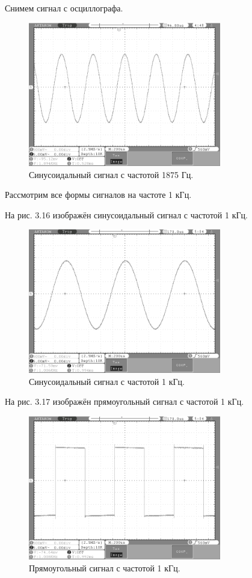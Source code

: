 	Снимем сигнал с осциллографа.
	\begin{figure}[H]
    \centering
    \includegraphics[width=0.75\textwidth]{../image/1875.bmp}
    \caption{Синусоидальный сигнал с частотой 1875 Гц.}
	\end{figure}	
	
	Рассмотрим все формы сигналов на частоте 1 кГц.
	
	На рис. 3.16 изображён синусоидальный сигнал с частотой 1 кГц.

	\begin{figure}[H]
    \centering
    \includegraphics[width=0.75\textwidth]{../image/sin1.bmp}
    \caption{Синусоидальный сигнал с частотой 1 кГц.}
	\end{figure}	


	На рис. 3.17 изображён прямоугольный сигнал с частотой 1 кГц.
	\begin{figure}[H]
    \centering
    \includegraphics[width=0.75\textwidth]{../image/square1.bmp}
    \caption{Прямоугольный сигнал с частотой 1 кГц.}
	\end{figure}	
	
